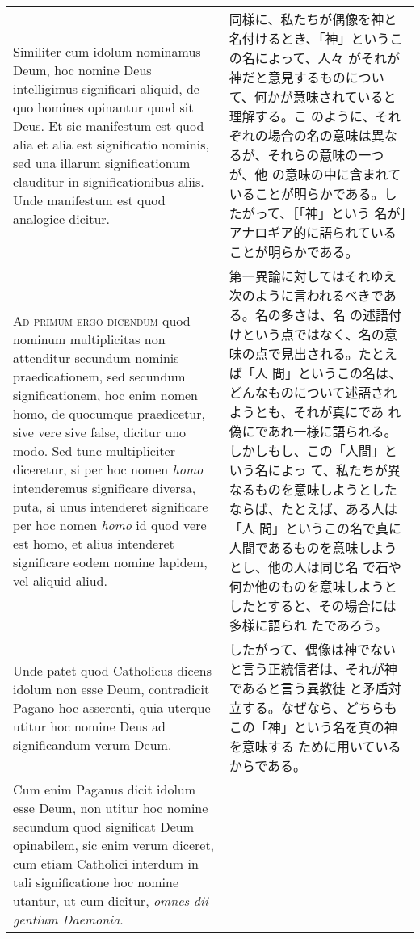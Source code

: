 \documentclass[10pt]{jsarticle} %
\begin{document}
\begin{longtable}{p{21em}p{21em}}
Similiter cum idolum nominamus Deum, hoc nomine
Deus intelligimus significari aliquid, de quo homines opinantur quod sit
Deus. Et sic manifestum est quod alia et alia est significatio nominis,
sed una illarum significationum clauditur in significationibus
aliis. Unde manifestum est quod analogice dicitur.

&

同様に、私たちが偶像を神と名付けるとき、「神」というこの名によって、人々
がそれが神だと意見するものについて、何かが意味されていると理解する。こ
のように、それぞれの場合の名の意味は異なるが、それらの意味の一つが、他
の意味の中に含まれていることが明らかである。したがって、［「神」という
名が］アナロギア的に語られていることが明らかである。

\\


{\scshape Ad primum ergo dicendum} quod nominum multiplicitas non
attenditur secundum nominis praedicationem, sed secundum
significationem, hoc enim nomen homo, de quocumque praedicetur, sive
vere sive false, dicitur uno modo. Sed tunc multipliciter diceretur, si
per hoc nomen {\itshape homo} intenderemus significare diversa, puta, si
unus intenderet significare per hoc nomen {\itshape homo} id quod vere
est homo, et alius intenderet significare eodem nomine lapidem, vel
aliquid aliud. 

&

第一異論に対してはそれゆえ次のように言われるべきである。名の多さは、名
の述語付けという点ではなく、名の意味の点で見出される。たとえば「人
間」というこの名は、どんなものについて述語されようとも、それが真にであ
れ偽にであれ一様に語られる。しかしもし、この「人間」という名によっ
て、私たちが異なるものを意味しようとしたならば、たとえば、ある人は「人
間」というこの名で真に人間であるものを意味しようとし、他の人は同じ名
で石や何か他のものを意味しようとしたとすると、その場合には多様に語られ
たであろう。


\\


Unde patet quod Catholicus dicens idolum non esse Deum,
contradicit Pagano hoc asserenti, quia uterque utitur hoc nomine Deus ad
significandum verum Deum. 

&

したがって、偶像は神でないと言う正統信者は、それが神であると言う異教徒
と矛盾対立する。なぜなら、どちらもこの「神」という名を真の神を意味する
ために用いているからである。

\\

Cum enim Paganus dicit idolum esse Deum, non
utitur hoc nomine secundum quod significat Deum opinabilem, sic enim
verum diceret, cum etiam Catholici interdum in tali significatione hoc
nomine utantur, ut cum dicitur, {\itshape omnes dii gentium Daemonia}.


\end{longtable}
\end{document}
